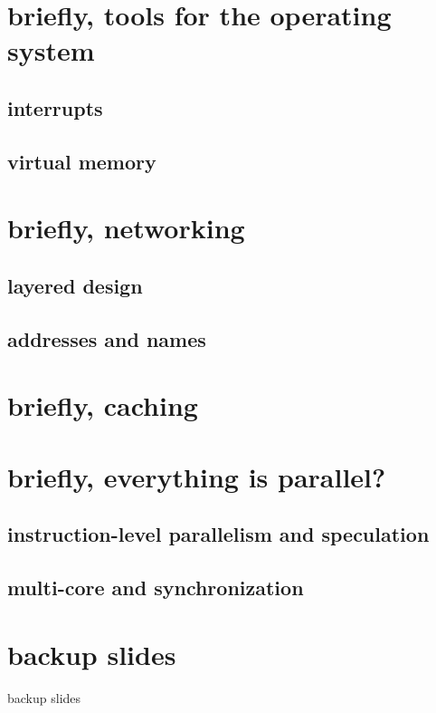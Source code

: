 \date{}
\title{}
\date{}

\begin{frame}
    \titlepage
\end{frame}

\section{briefly, tools for the operating system}

\subsection{interrupts}

\subsection{virtual memory}

\section{briefly, networking}

\subsection{layered design}

\subsection{addresses and names}

\section{briefly, caching}

\section{briefly, everything is parallel?}

\subsection{instruction-level parallelism and speculation}

\subsection{multi-core and synchronization}

\section{backup slides}
\begin{frame}{backup slides}
\end{frame}


